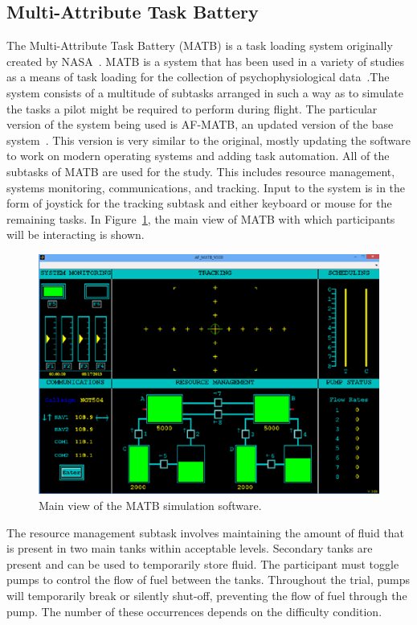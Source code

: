 \documentclass[11pt]{article}
\begin{document}
\subsection{Multi-Attribute Task Battery}
The Multi-Attribute Task Battery (MATB) is a task loading system originally created by NASA~\cite{Comstock}. MATB is a system that has been used in a variety of studies as a means of task loading for the collection of psychophysiological data~\cite{Wilson, Smith, Wang_Z}.The system consists of a multitude of subtasks arranged in such a way as to simulate the tasks a pilot might be required to perform during flight. The particular version of the system being used is AF-MATB, an updated version of the base system~\cite{Estepp}. This version is very similar to the original, mostly updating the software to work on modern operating systems and adding task automation. All of the subtasks of MATB are used for the study. This includes resource management, systems monitoring, communications, and tracking. Input to the system is in the form of joystick for the tracking subtask and either keyboard or mouse for the remaining tasks. In Figure~\ref{fig:matb}, the main view of MATB with which participants will be interacting is shown.

\begin{figure}[p]
    \centering
    \includegraphics[width=\linewidth]{figures/matb.png}
    \caption{Main view of the MATB simulation software. }
    \label{fig:matb}
\end{figure}

The resource management subtask involves maintaining the amount of fluid that is present in two main tanks within acceptable levels. Secondary tanks are present and can be used to temporarily store fluid. The participant must toggle pumps to control the flow of fuel between the tanks. Throughout the trial, pumps will temporarily break or silently shut-off, preventing the flow of fuel through the pump. The number of these occurrences depends on the difficulty condition.
\end{document}
